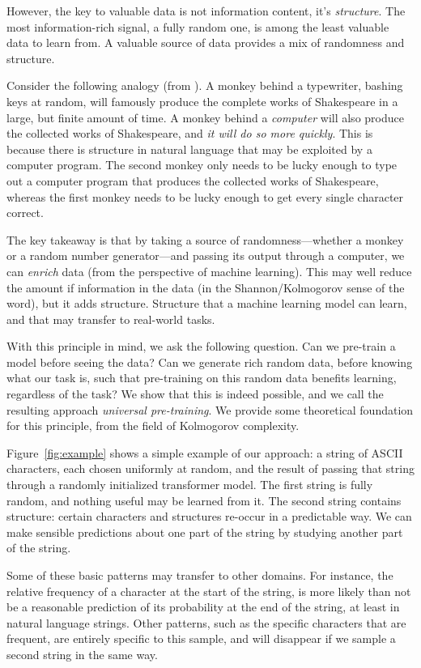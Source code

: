 \documentclass{article} %
\begin{document}
However, the key to valuable data is not information content, it's \emph{structure}. The most information-rich signal, a fully random one, is among the least valuable data to learn from. A valuable source of data provides a mix of randomness and structure.

Consider the following analogy (from \cite{}). A monkey behind a typewriter, bashing keys at random, will famously produce the complete works of Shakespeare in a large, but finite amount of time. A monkey behind a \emph{computer} will also produce the collected works of Shakespeare, and \emph{it will do so more quickly}. This is because there is structure in natural language that may be exploited by a computer program. The second monkey only needs to be lucky enough to type out a computer program that produces the collected works of Shakespeare, whereas the first monkey needs to be lucky enough to get every single character correct.

The key takeaway is that by taking a source of randomness---whether a monkey or a random number generator---and passing its output through a computer, we can \emph{enrich} data (from the perspective of machine learning). This may well reduce the amount if information in the data (in the Shannon/Kolmogorov sense of the word), but it adds structure. Structure that a machine learning model can learn, and that may transfer to real-world tasks.

With this principle in mind, we ask the following question. Can we pre-train a model before seeing the data? Can we generate rich random data, before knowing what our task is, such that pre-training on this random data benefits learning, regardless of the task? We show that this is indeed possible, and we call the resulting approach \emph{universal pre-training}. We provide some theoretical foundation for this principle, from the field of Kolmogorov complexity.

Figure~\ref{fig:example} shows a simple example of our approach: a string of ASCII characters, each chosen uniformly at random, and the result of passing that string through a randomly initialized transformer model. The first string is fully random, and nothing useful may be learned from it. The second string contains structure: certain characters and structures re-occur in a predictable way. We can make sensible predictions about one part of the string by studying another part of the string. 

Some of these basic patterns may transfer to other domains. For instance, the relative frequency of a character at the start of the string, is more likely than not be a reasonable prediction of its probability at the end of the string, at least in natural language strings. Other patterns, such as the specific characters that are frequent, are entirely specific to this sample, and will disappear if we sample a second string in the same way. 
\end{document}
